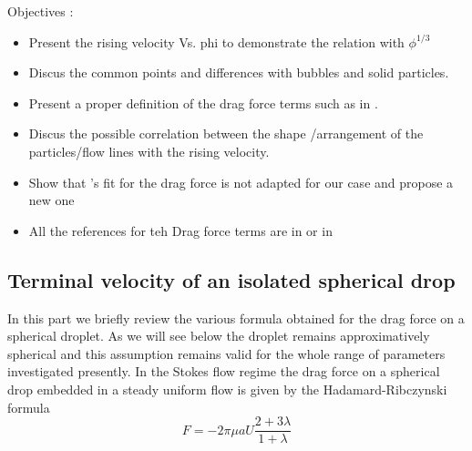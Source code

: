 Objectives : 
\begin{itemize}
    \item Present the rising velocity Vs. phi to demonstrate the relation with $\phi^{1/3}$ \citep{loisy2017buoyancy}
    \item Discus the common points and differences with bubbles and solid particles. 
    \item Present a proper definition of the drag force terms such as in \citet{wang2021numerical}. 
    \item Discus the possible correlation between the shape /arrangement of the particles/flow lines with the rising velocity. 
    \item Show that \citet{rusche2000effect}'s fit for the drag force is not adapted for our case and propose a new one
    \item All the references for teh Drag force terms are in \citet[chap 8]{morel2015mathematical} or in \citet{ishii2010thermo}
\end{itemize}

\subsection{Terminal velocity of an isolated spherical drop}

In this part we briefly review the various formula obtained for the drag force on a spherical droplet. As we will see below the droplet remains approximatively spherical and this assumption remains valid for the whole range of parameters investigated presently.
In the Stokes flow regime the drag force on a spherical drop embedded in a steady uniform flow is given by the Hadamard-Ribczynski formula
\begin{equation}
F = -2\pi \mu a U \frac{2+3\lambda}{1+\lambda}
\end{equation}


